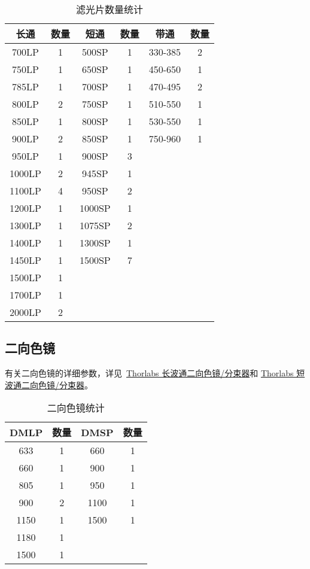 \documentclass[cn,11pt,chinese]{elegantbook}
\begin{document}
\begin{table}[ht]
  \centering
  \caption{滤光片数量统计}
  \begin{tabular}{cc|cc|cc}
    \toprule
    长通&数量&短通&数量&带通&数量 \\
    \midrule
    700LP & 1     & 500SP & 1     & 330-385 & 2 \\
    750LP & 1     & 650SP & 1     & 450-650 & 1 \\
    785LP & 1     & 700SP & 1     & 470-495 & 2 \\
    800LP & 2     & 750SP & 1     & 510-550 & 1 \\
    850LP & 1     & 800SP & 1     & 530-550 & 1 \\
    900LP & 2     & 850SP & 1     & 750-960 & 1 \\
    950LP & 1     & 900SP & 3     &       &  \\
    1000LP & 2     & 945SP & 1     &       &  \\
    1100LP & 4     & 950SP & 2     &       &  \\
    1200LP & 1     & 1000SP & 1     &       &  \\
    1300LP & 1     & 1075SP & 2     &       &  \\
    1400LP & 1     & 1300SP & 1     &       &  \\
    1450LP & 1     & 1500SP & 7     &       &  \\
    1500LP & 1     &       &       &       &  \\
    1700LP & 1     &       &       &       &  \\
    2000LP & 2     &       &       &       &  \\
    \bottomrule
  \end{tabular}
  \label{tab:filter}
\end{table}

\subsection{二向色镜}
有关二向色镜的详细参数，详见~\href{https://www.thorlabschina.cn/newgrouppage9.cfm?objectgroup_id=3313}{Thorlabs 长波通二向色镜/分束器}和
\href{https://www.thorlabschina.cn/newgrouppage9.cfm?objectgroup_id=9240}{Thorlabs 短波通二向色镜/分束器}。

\begin{table}[htbp]
  \centering
  \caption{二向色镜统计}
    \begin{tabular}{cc|cc}
      \toprule
    DMLP  & 数量    & DMSP  & 数量 \\
    \midrule
    633   & 1     & 660   & 1 \\
    660   & 1     & 900   & 1 \\
    805   & 1     & 950   & 1 \\
    900   & 2     & 1100  & 1 \\
    1150  & 1     & 1500  & 1 \\
    1180  & 1     &       &  \\
    1500  & 1     &       &  \\
    
    \bottomrule
    \end{tabular}%
  \label{tab:DM}%
\end{table}%
\end{document}
